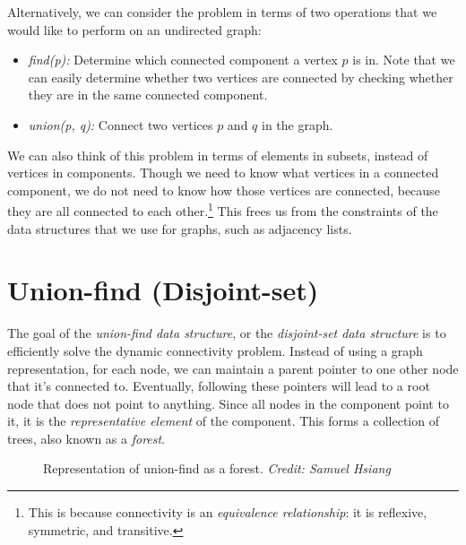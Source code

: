 \documentclass{article}
\begin{document}
Alternatively, we can consider the problem in terms of two operations that we would like to perform on an undirected graph:

\begin{itemize}
    \item \textit{find(p):} Determine which connected component a vertex $p$ is in. Note that we can easily determine whether two vertices are connected by checking whether they are in the same connected component.
    \item \textit{union(p, q):} Connect two vertices $p$ and $q$ in the graph.
\end{itemize}

We can also think of this problem in terms of elements in subsets, instead of vertices in components. Though we need to know what vertices in a connected component, we do not need to know how those vertices are connected, because they are all connected to each other.\footnote{This is because connectivity is an \textit{equivalence relationship}: it is reflexive, symmetric, and transitive.} This frees us from the constraints of the data structures that we use for graphs, such as adjacency lists.


\pagebreak

\section{Union-find (Disjoint-set)}

The goal of the \textit{union-find data structure}, or the \textit{disjoint-set data structure} is to efficiently solve the dynamic connectivity problem. Instead of using a graph representation, for each node, we can maintain a parent pointer to one other node that it's connected to. Eventually, following these pointers will lead to a root node that does not point to anything. Since all nodes in the component point to it, it is the \textit{representative element} of the component. This forms a collection of trees, also known as a \textit{forest}.

\begin{figure}[h]
\centering
{}
\caption{Representation of union-find as a forest. \textit{Credit: Samuel Hsiang}}
\end{figure}
\end{document}
